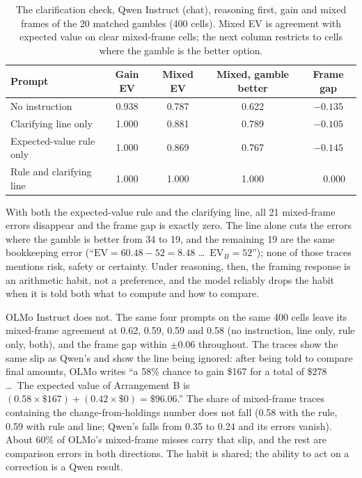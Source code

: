 \documentclass[11pt]{article}
\begin{document}
\begin{table}[h]
\centering
\small
\caption{The clarification check, Qwen Instruct (chat), reasoning first, gain and mixed frames of the 20
matched gambles (400 cells). Mixed EV is agreement with expected value on clear mixed-frame cells;
the next column restricts to cells where the gamble is the better option.}
\label{tab:clarify}
\begin{tabular}{@{}lcccc@{}}
\toprule
Prompt & Gain EV & Mixed EV & Mixed, gamble better & Frame gap \\
\midrule
No instruction & 0.938 & 0.787 & 0.622 & $-0.135$ \\
Clarifying line only & 1.000 & 0.881 & 0.789 & $-0.105$ \\
Expected-value rule only & 1.000 & 0.869 & 0.767 & $-0.145$ \\
Rule and clarifying line & 1.000 & 1.000 & 1.000 & $\phantom{-}0.000$ \\
\bottomrule
\end{tabular}
\end{table}

With both the expected-value rule and the clarifying line, all 21 mixed-frame errors disappear and the
frame gap is exactly zero. The line alone cuts the errors where the gamble is better from 34 to 19, and the
remaining 19 are the same bookkeeping error (``$\text{EV} = 60.48 - 52 = 8.48$ \ldots\ $\text{EV}_B = 52$'');
none of those traces mentions risk, safety or certainty. Under reasoning, then, the framing response is an
arithmetic habit, not a preference, and the model reliably drops the habit when it is told both what to
compute and how to compare.

OLMo Instruct does not. The same four prompts on the same 400 cells leave its mixed-frame agreement at
0.62, 0.59, 0.59 and 0.58 (no instruction, line only, rule only, both), and the frame gap within
$\pm 0.06$ throughout. The traces show the same slip as Qwen's and show the line being ignored: after
being told to compare final amounts, OLMo writes ``a 58\% chance to gain \$167 for a total of \$278
\ldots\ The expected value of Arrangement B is $(0.58 \times \$167) + (0.42 \times \$0) = \$96.06$.''
The share of mixed-frame traces containing the change-from-holdings number does not fall (0.58 with
the rule, 0.59 with rule and line; Qwen's falls from 0.35 to 0.24 and its errors vanish). About 60\% of
OLMo's mixed-frame misses carry that slip, and the rest are comparison errors in both directions. The
habit is shared; the ability to act on a correction is a Qwen result.
\end{document}
